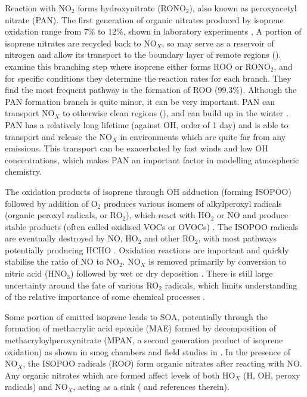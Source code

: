     
    Reaction with NO$_2$ forms hydroxynitrate (RONO$_2$), also known as peroxyacetyl nitrate (PAN).
    The first generation of organic nitrates produced by isoprene oxidation range from 7\% to 12\%, shown in laboratory experiments \citep{Paulot2009a, Mao2013},
    A portion of isoprene nitrates are recycled back to NO$_X$, so may serve as a reservoir of nitrogen and allow its transport to the boundary layer of remote regions (\cite{Patchen2007,Paulot2009a}).
    \cite{Patchen2007} examine this branching step where isoprene either forms ROO or RONO$_2$, and for specific conditions they determine the reaction rates for each branch.
    They find the most frequent pathway is the formation of ROO (99.3\%).
    Although the PAN formation branch is quite minor, it can be very important.
    PAN can transport NO$_X$ to otherwise clean regions (\cite{Horowitz1998}), and can build up in the winter \citep{Lelieveld2009}.
    PAN has a relatively long lifetime (against OH, order of 1 day) and is able to transport and release the NO$_X$ in environments which are quite far from any emissions.
    This transport can be exacerbated by fast winds and low OH concentrations, which makes PAN an important factor in modelling atmospheric chemistry.
    
    
    The oxidation products of isoprene through OH adduction (forming ISOPOO) followed by addition of O$_2$ produces various isomers of alkylperoxyl radicals (organic peroxyl radicals, or RO$_2$), which react with HO$_2$ or NO and produce stable products (often called oxidised VOCs or OVOCs) \citep{Nguyen2014}.
    The ISOPOO radicals are eventually destroyed by NO, HO$_2$ and other RO$_2$, with most pathways potentially producing HCHO \citep{Wolfe2016}.
    Oxidation reactions are important and quickly stabilise the ratio of NO to NO$_2$. 
    NO$_X$ is removed primarily by conversion to nitric acid (HNO$_3$) followed by wet or dry deposition \citep{Ayers2006}.
    There is still large uncertainty around the fate of various RO$_2$ radicals, which limits understanding of the relative importance of some chemical processes \citep{Crounse2013}.
    
    Some portion of emitted isoprene leads to SOA, potentially through the formation of methacrylic acid epoxide (MAE) formed by decomposition of methacryloylperoxynitrate (MPAN, a second generation product of isoprene oxidation) as shown in smog chambers and field studies in \cite{Lin2013}.
    In the presence of NO$_X$, the ISOPOO radicals (RO$\dot{O}$) form organic nitrates after reacting with NO.
    Any organic nitrates which are formed affect levels of both HO$_X$ (H, OH, peroxy radicals) and NO$_X$, acting as a sink (\cite{Mao2013} and references therein).
    
